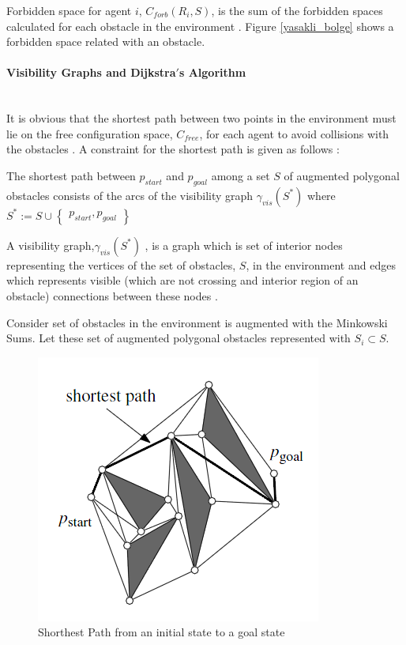 Forbidden space for agent $i$, $C_{forb}(R_i, S)$, is the sum of the forbidden spaces calculated for each obstacle in the environment \cite{92}. Figure \ref{yasakli_bolge} shows a forbidden space related with an obstacle.
	
\paragraph{Visibility Graphs and Dijkstra$'$s Algorithm}\hspace{0pt} \\
It is obvious that the shortest path between two points in the environment must lie on the free configuration space, $C_{free}$, for each agent to avoid collisions with the obstacles . A constraint for the shortest path is given as follows \cite{92}: 

\begin{displayquote}
The shortest path between $p_{start}$ and $p_{goal}$ among a set $S$ of augmented polygonal obstacles consists of the arcs of the visibility graph $\gamma_{vis}(S^*)$ where $S^* := S \cup \begin{Bmatrix}
p_{start}, p_{goal}
\end{Bmatrix}$
\end{displayquote}

A visibility graph,$\gamma_{vis}(S^*)$ , is a graph which is set of interior nodes representing the vertices of the set of obstacles, $S$, in the environment and edges which represents visible (which are not crossing and interior region of an obstacle) connections between these nodes \cite{92}. 

Consider set of obstacles in the environment is augmented with the Minkowski Sums. Let these set of augmented polygonal obstacles represented with $S_i \subset S$. 

\begin{figure}[H]
\caption{Shorthest Path from an initial state to a goal state \cite{92}} \label{dijksttae_visibility}
\centering
\includegraphics[scale = 0.9]{shortest}
\end{figure} 

